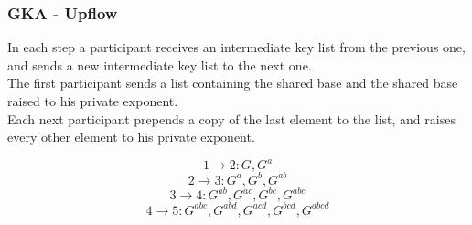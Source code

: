 \begin{frame}
  \frametitle{GKA - Upflow}
  In each step a participant receives an intermediate key list from the previous one, and sends a new intermediate key list to the next one.\\[0.3cm]

  The first participant sends a list containing the shared base and the shared base raised to his private exponent.\\[0.3cm]

  Each next participant prepends a copy of the last element to the list, and raises every other element to his private exponent.\\[0.3cm]

  \begin{minipage}{.47\textwidth}
    \[ 1 \rightarrow 2: G, G^a \]
    \[ 2 \rightarrow 3: G^a, G^b, G^{ab} \]
    \[ 3 \rightarrow 4: G^{ab}, G^{ac}, G^{bc}, G^{abc} \]
    \[ 4 \rightarrow 5: G^{abc}, G^{abd}, G^{acd}, G^{bcd}, G^{abcd} \]
  \end{minipage}
  \begin{minipage}{.47\textwidth}
   \begin{figure}
    \end{figure}
  \end{minipage}
\end{frame}


